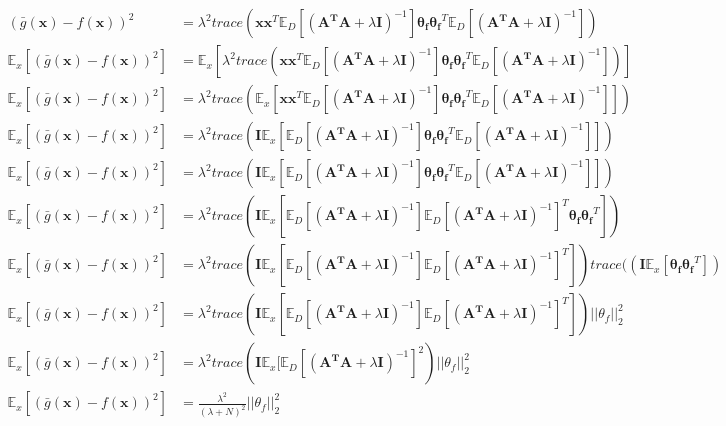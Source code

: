 \documentclass[11pt]{article}
\begin{document}
\begin{enumerate}[label=(\alph*)]
\begin{enumerate}[label=(\roman*)]
\begin{align*}
(\bar{g}(\mathbf{x})-f(\mathbf{x}))^2 &=  \lambda^2  trace(\mathbf{x}\mathbf{x}^T\mathbb{E}_D [(\mathbf{A^T}\mathbf{A}+\lambda \mathbf{I})^{-1}]\mathbf{\theta_f}\mathbf{\theta_f}^T\mathbb{E}_D [(\mathbf{A^T}\mathbf{A}+\lambda \mathbf{I})^{-1}]) \\
\mathbb{E}_x[(\bar{g}(\mathbf{x})-f(\mathbf{x}))^2] &=  \mathbb{E}_x[\lambda^2  trace(\mathbf{x}\mathbf{x}^T\mathbb{E}_D [(\mathbf{A^T}\mathbf{A}+\lambda \mathbf{I})^{-1}]\mathbf{\theta_f}\mathbf{\theta_f}^T\mathbb{E}_D [(\mathbf{A^T}\mathbf{A}+\lambda \mathbf{I})^{-1}])] \\
\mathbb{E}_x[(\bar{g}(\mathbf{x})-f(\mathbf{x}))^2] &= \lambda^2 trace(\mathbb{E}_x[ \mathbf{x}\mathbf{x}^T\mathbb{E}_D [(\mathbf{A^T}\mathbf{A}+\lambda \mathbf{I})^{-1}]\mathbf{\theta_f}\mathbf{\theta_f}^T\mathbb{E}_D [(\mathbf{A^T}\mathbf{A}+\lambda \mathbf{I})^{-1}]]) \\
\mathbb{E}_x[(\bar{g}(\mathbf{x})-f(\mathbf{x}))^2] &= \lambda^2 trace(\mathbf{I} \mathbb{E}_x[\mathbb{E}_D [(\mathbf{A^T}\mathbf{A}+\lambda \mathbf{I})^{-1}]\mathbf{\theta_f}\mathbf{\theta_f}^T\mathbb{E}_D [(\mathbf{A^T}\mathbf{A}+\lambda \mathbf{I})^{-1}]]) \\
\mathbb{E}_x[(\bar{g}(\mathbf{x})-f(\mathbf{x}))^2] &= \lambda^2 trace(\mathbf{I} \mathbb{E}_x[\mathbb{E}_D [(\mathbf{A^T}\mathbf{A}+\lambda \mathbf{I})^{-1}]\mathbf{\theta_f}\mathbf{\theta_f}^T\mathbb{E}_D [(\mathbf{A^T}\mathbf{A}+\lambda \mathbf{I})^{-1}]]) \\
\mathbb{E}_x[(\bar{g}(\mathbf{x})-f(\mathbf{x}))^2] &= \lambda^2 trace(\mathbf{I} \mathbb{E}_x[\mathbb{E}_D [(\mathbf{A^T}\mathbf{A}+\lambda \mathbf{I})^{-1}]\mathbb{E}_D [(\mathbf{A^T}\mathbf{A}+\lambda \mathbf{I})^{-1}]^T\mathbf{\theta_f}\mathbf{\theta_f}^T]) \\
\mathbb{E}_x[(\bar{g}(\mathbf{x})-f(\mathbf{x}))^2] &= \lambda^2 trace(\mathbf{I} \mathbb{E}_x[\mathbb{E}_D [(\mathbf{A^T}\mathbf{A}+\lambda \mathbf{I})^{-1}]\mathbb{E}_D [(\mathbf{A^T}\mathbf{A}+\lambda \mathbf{I})^{-1}]^T])trace((\mathbf{I} \mathbb{E}_x[\mathbf{\theta_f}\mathbf{\theta_f}^T]) \\
\mathbb{E}_x[(\bar{g}(\mathbf{x})-f(\mathbf{x}))^2] &= \lambda^2 trace(\mathbf{I} \mathbb{E}_x[\mathbb{E}_D [(\mathbf{A^T}\mathbf{A}+\lambda \mathbf{I})^{-1}]\mathbb{E}_D [(\mathbf{A^T}\mathbf{A}+\lambda \mathbf{I})^{-1}]^T])||\theta_f||_2^2 \\
\mathbb{E}_x[(\bar{g}(\mathbf{x})-f(\mathbf{x}))^2] &= \lambda^2 trace(\mathbf{I} \mathbb{E}_x[\mathbb{E}_D [(\mathbf{A^T}\mathbf{A}+\lambda \mathbf{I})^{-1}]^2)||\theta_f||_2^2 \\
\mathbb{E}_x[(\bar{g}(\mathbf{x})-f(\mathbf{x}))^2] &= \frac{\lambda^2}{(\lambda + N)^2}||\theta_f||_2^2 \\
\end{align*}


\end{enumerate}
\end{enumerate}
\end{document}
